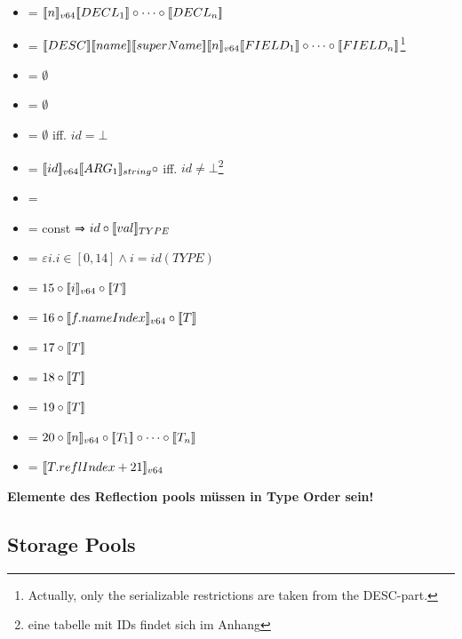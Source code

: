 \begin{itemize}
 \item {} = $[\![n]\!]_{v64}[\![DECL_1]\!] \circ \cdots \circ [\![DECL_n]\!]$

 \item {} = $\den{DESC}\den{name}\den{superName}\den{n}_{v64}\den{FIELD_1}\circ \cdots \circ \den{FIELD_n}$\footnote{Actually, only the serializable restrictions are taken from the DESC-part.}
 
 \item {} = $\emptyset$
 
 \item {} = $\emptyset$
 
 \item {} = $\emptyset$ iff. $id = \bot$
 \item {} = $[\![id]\!]_{v64}[\![ARG_1]\!]_{string} \circ $ iff. $id \neq \bot$\footnote{eine tabelle mit IDs findet sich im Anhang}
 
 \item {} = 
 
 \item {} = const ⇒ $id \circ [\![val]\!]_{TYPE}$
 \item {} = $\varepsilon i. i \in [0,14] \wedge i = id(TYPE)$
 
 \item {} = $15 \circ [\![i]\!]_{v64} \circ [\![T]\!]$
 \item {} = $16 \circ [\![f.nameIndex]\!]_{v64} \circ [\![T]\!]$
 \item {} = $17 \circ [\![T]\!]$
 \item {} = $18 \circ [\![T]\!]$
 \item {} = $19 \circ [\![T]\!]$
 \item {} = $20 \circ [\![n]\!]_{v64} \circ [\![T_1]\!] \circ \cdots \circ [\![T_n]\!]$
 
 \item {} = $[\![T.reflIndex + 21]\!]_{v64}$

\end{itemize}
\textbf{Elemente des Reflection pools müssen in Type Order sein!}


\subsection{Storage Pools}

